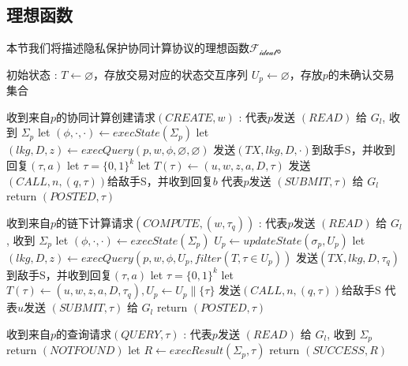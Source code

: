 \subsection{理想函数}
本节我们将描述隐私保护协同计算协议的理想函数$\mathcal{F_{ideal}}$。
\begin{breakablealgorithm}
    \caption{$\mathcal{F}_{Post}$}
    \label{alg:ch4-4}
    \begin{algorithmic} 
        \item[初始状态]: 
        \STATE $T \leftarrow \varnothing$，存放交易对应的状态交互序列
        \STATE $U_p \leftarrow \varnothing$，存放$p$的未确认交易集合
        \item[收到来自$p$的协同计算创建请求$(CREATE, w)$]:
        \STATE 代表$p$发送 $(READ)$ 给 $G_l$, 收到 $\Sigma_p$
        \STATE let $(\phi, \cdot, \cdot) \leftarrow execState(\Sigma_p)$
        \STATE let $(lkg, D, z) \leftarrow execQuery(p, w, \phi, \varnothing, \varnothing)$
        \STATE 发送$(TX, lkg, D, \cdot)$到敌手S，并收到回复$(\tau, a)$
        \STATE let $\tau = \{0, 1\}^k$
        \ENDIF
        \STATE let $T(\tau) \leftarrow (u, w, z, a, D, \tau)$
        \STATE 发送$(CALL, n, (q, \tau))$给敌手S，并收到回复$b$
        \ENDFOR
        \STATE 代表$p$发送 $(SUBMIT, \tau)$ 给 $G_l$
        \STATE return $(POSTED, \tau)$

        \item[收到来自$p$的链下计算请求$(COMPUTE, (w, \tau_q))$]:
        \STATE 代表$p$发送 $(READ)$ 给 $G_l$, 收到 $\Sigma_p$
        \STATE let $(\phi, \cdot, \cdot) \leftarrow execState(\Sigma_p)$
        \STATE $U_p \leftarrow updateState(\sigma_p, U_p)$
        \STATE let $(lkg, D, z) \leftarrow execQuery(p, w, \phi, U_p, filter(T, \tau \in U_p))$
        \STATE 发送$(TX, lkg, D, \tau_q)$到敌手S，并收到回复$(\tau, a)$
        \STATE let $\tau = \{0, 1\}^k$
        \ENDIF
        \STATE let $T(\tau) \leftarrow (u, w, z, a, D, \tau_q), U_p \leftarrow U_p \parallel \{\tau\}$
        \STATE 发送$(CALL, n, (q, \tau))$给敌手S
        \ENDFOR
        \STATE 代表$u$发送 $(SUBMIT, \tau)$ 给 $G_l$
        \STATE return $(POSTED, \tau)$

        \item[收到来自$p$的查询请求$(QUERY, \tau)$]:
        \STATE 代表$p$发送 $(READ)$ 给 $G_l$, 收到 $\Sigma_p$
        \STATE return $(NOT FOUND)$
        \ENDIF
        \STATE let $R \leftarrow execResult(\Sigma_p, \tau)$
        \STATE return $(SUCCESS, R)$


\end{algorithmic}
\end{breakablealgorithm}
